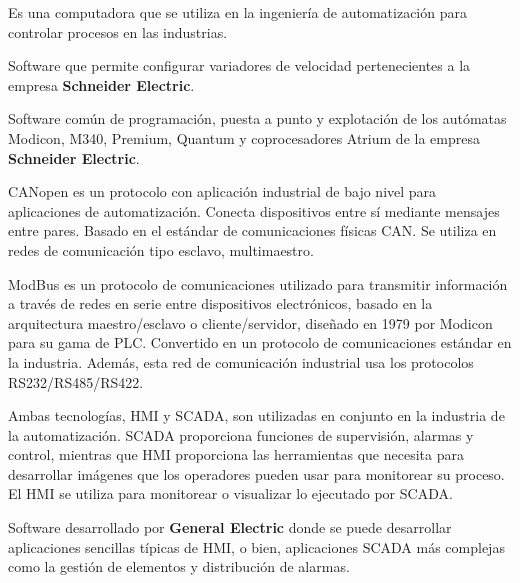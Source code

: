 \begin{tcolorbox}[colback=blue!5!white,colframe=blue!75!black,title=PLC]
	Es una computadora que se utiliza en la ingeniería de automatización para controlar procesos en las industrias.
\end{tcolorbox}

\begin{tcolorbox}[colback=blue!5!white,colframe=blue!75!black,title=SoMove]
	Software que permite configurar variadores de velocidad pertenecientes a la empresa \textbf{Schneider Electric}.
\end{tcolorbox}

\begin{tcolorbox}[colback=blue!5!white,colframe=blue!75!black,title=Unity Pro]
	Software común de programación, puesta a punto y
	explotación de los autómatas Modicon, M340, Premium, Quantum y
	coprocesadores Atrium de la empresa \textbf{Schneider Electric}.
\end{tcolorbox}

\begin{tcolorbox}[colback=blue!5!white,colframe=blue!75!black,title=CANopen]
	CANopen es un protocolo con aplicación industrial de bajo nivel para aplicaciones de automatización. Conecta dispositivos entre sí mediante mensajes entre pares. Basado en el estándar de comunicaciones físicas CAN. Se utiliza en redes de comunicación tipo esclavo, multimaestro. 
\end{tcolorbox}

\begin{tcolorbox}[colback=blue!5!white,colframe=blue!75!black,title=ModBus]
	ModBus es un protocolo de comunicaciones utilizado para transmitir información a través de redes en serie entre dispositivos electrónicos, basado en la arquitectura maestro/esclavo o cliente/servidor, diseñado en 1979 por Modicon para su gama de PLC. Convertido en un protocolo de comunicaciones estándar en la industria. Además, esta red de comunicación industrial usa los protocolos RS232/RS485/RS422.
\end{tcolorbox}

\begin{tcolorbox}[colback=blue!5!white,colframe=blue!75!black,title=HMI - SCADA]
	Ambas tecnologías, HMI y SCADA, son utilizadas en conjunto en la industria de la automatización. SCADA proporciona funciones de supervisión, alarmas y control, mientras que HMI proporciona las herramientas que necesita para desarrollar imágenes que los operadores pueden usar para monitorear su proceso. El HMI se utiliza para monitorear o visualizar lo ejecutado por SCADA.
\end{tcolorbox}

\begin{tcolorbox}[colback=blue!5!white,colframe=blue!75!black,title=iFIX]
	Software desarrollado por \textbf{General Electric} donde se puede desarrollar aplicaciones sencillas típicas de HMI, o bien, aplicaciones SCADA más complejas como la gestión de elementos y distribución de alarmas.
\end{tcolorbox}
\newpage